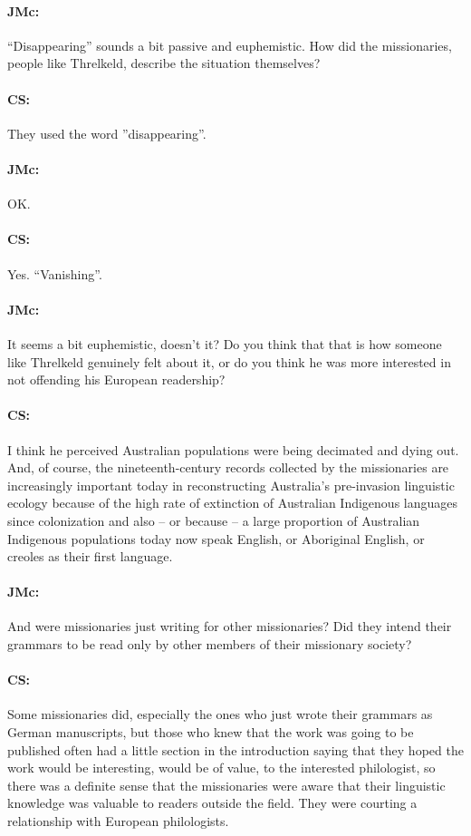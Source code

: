 \documentclass[output=paper]{langscibook}
\begin{document}
\paragraph*{JMc:}  “Disappearing” sounds a bit passive and euphemistic. How did the missionaries, people like Threlkeld, describe the situation themselves?


\paragraph*{CS:}  They used the word ”disappearing”.


\paragraph*{JMc:}  OK.


\paragraph*{CS:}  Yes. “Vanishing”.


\paragraph*{JMc:}  It seems a bit euphemistic, doesn’t it? Do you think that that is how someone like Threlkeld genuinely felt about it, or do you think he was more interested in not offending his European readership?


\paragraph*{CS:}  I think he perceived Australian populations were being decimated and dying out. And, of course, the nineteenth-century records collected by the missionaries are increasingly important today in reconstructing Australia’s pre-invasion linguistic ecology because of the high rate of extinction of Australian Indigenous languages since colonization and also – or because – a large proportion of Australian Indigenous populations today now speak English, or Aboriginal English, or creoles as their first language.


\paragraph*{JMc:}  And were missionaries just writing for other missionaries? Did they intend their grammars to be read only by other members of their missionary society?


\paragraph*{CS:}  Some missionaries did, especially the ones who just wrote their grammars as German manuscripts, but those who knew that the work was going to be published often had a little section in the introduction saying that they hoped the work would be interesting, would be of value, to the interested philologist, so there was a definite sense that the missionaries were aware that their linguistic knowledge was valuable to readers outside the field. They were courting a relationship with European philologists.
\end{document}
